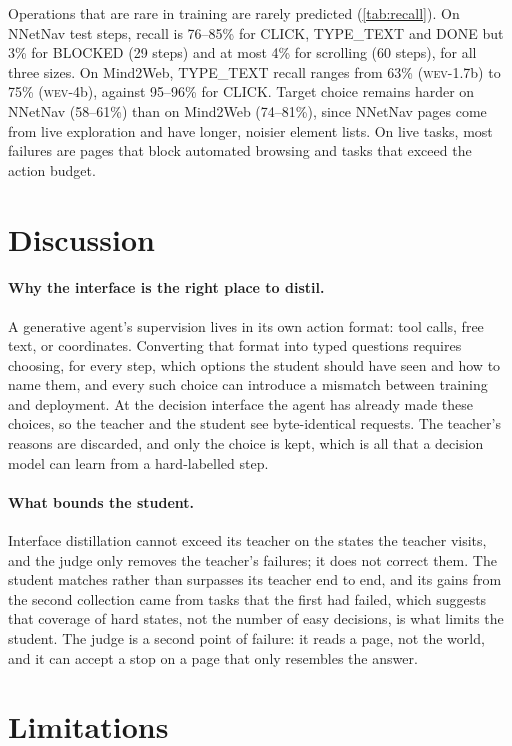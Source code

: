 \documentclass{article}
\newcommand{\wev}{\textsc{wev}\xspace}
\begin{document}
Operations that are rare in training are rarely predicted (\cref{tab:recall}). On NNetNav test steps, recall is 76--85\% for CLICK,
TYPE\_TEXT and DONE but 3\% for BLOCKED (29 steps) and at most 4\% for scrolling (60 steps), for all three sizes. On
Mind2Web, TYPE\_TEXT recall ranges from 63\% (\wev-1.7b) to 75\% (\wev-4b), against 95--96\% for CLICK. Target choice
remains harder on NNetNav (58--61\%) than on Mind2Web (74--81\%), since NNetNav pages come from live exploration and
have longer, noisier element lists. On live tasks, most failures are pages that block automated browsing and tasks
that exceed the action budget.

\section{Discussion}
\label{sec:discussion}

\paragraph{Why the interface is the right place to distil.} A generative agent's supervision lives in its own action
format: tool calls, free text, or coordinates. Converting that format into typed questions requires choosing, for every
step, which options the student should have seen and how to name them, and every such choice can introduce a mismatch
between training and deployment. At the decision interface the agent has already made these choices, so the teacher
and the student see byte-identical requests. The teacher's reasons are discarded, and only the choice is kept, which is
all that a decision model can learn from a hard-labelled step.

\paragraph{What bounds the student.} Interface distillation cannot exceed its teacher on the states the teacher visits,
and the judge only removes the teacher's failures; it does not correct them. The student matches rather than surpasses
its teacher end to end, and its gains from the second collection came from tasks that the first had failed, which
suggests that coverage of hard states, not the number of easy decisions, is what limits the student. The judge is a
second point of failure: it reads a page, not the world, and it can accept a stop on a page that only resembles the
answer.

\section{Limitations}
\label{sec:limitations}
\end{document}
